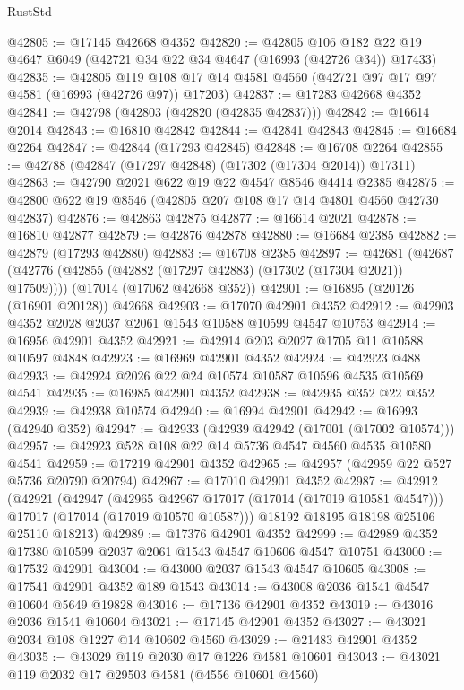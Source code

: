 \begin{lexlean}{RustStd}
\begin{coremodule}
@42805 := @17145 @42668 @4352
@42820 := @42805
    @106
    @182
    @22
    @19
    @4647
    @6049
    (@42721 @34 @22 @34 @4647 (@16993 (@42726 @34)) @17433)
@42835 := @42805
    @119
    @108
    @17
    @14
    @4581
    @4560
    (@42721 @97 @17 @97 @4581 (@16993 (@42726 @97)) @17203)
@42837 := @17283 @42668 @4352
@42841 := @42798 (@42803 (@42820 (@42835 @42837)))
@42842 := @16614 @2014
@42843 := @16810 @42842
@42844 := @42841 @42843
@42845 := @16684 @2264
@42847 := @42844 (@17293 @42845)
@42848 := @16708 @2264
@42855 := @42788 (@42847 (@17297 @42848) (@17302 (@17304 @2014)) @17311)
@42863 := @42790 @2021 @622 @19 @22 @4547 @8546 @4414 @2385
@42875 := @42800 @622 @19 @8546 (@42805 @207 @108 @17 @14 @4801 @4560 @42730 @42837)
@42876 := @42863 @42875
@42877 := @16614 @2021
@42878 := @16810 @42877
@42879 := @42876 @42878
@42880 := @16684 @2385
@42882 := @42879 (@17293 @42880)
@42883 := @16708 @2385
@42897 := @42681
    (@42687 (@42776 (@42855 (@42882 (@17297 @42883) (@17302 (@17304 @2021)) @17509))))
    (@17014 (@17062 @42668 @352))
@42901 := @16895 (@20126 (@16901 @20128)) @42668
@42903 := @17070 @42901 @4352
@42912 := @42903 @4352 @2028 @2037 @2061 @1543 @10588 @10599 @4547 @10753
@42914 := @16956 @42901 @4352
@42921 := @42914 @203 @2027 @1705 @11 @10588 @10597 @4848
@42923 := @16969 @42901 @4352
@42924 := @42923 @488
@42933 := @42924 @2026 @22 @24 @10574 @10587 @10596 @4535 @10569 @4541
@42935 := @16985 @42901 @4352
@42938 := @42935 @352 @22 @352
@42939 := @42938 @10574
@42940 := @16994 @42901
@42942 := @16993 (@42940 @352)
@42947 := @42933 (@42939 @42942 (@17001 (@17002 @10574)))
@42957 := @42923 @528 @108 @22 @14 @5736 @4547 @4560 @4535 @10580 @4541
@42959 := @17219 @42901 @4352
@42965 := @42957 (@42959 @22 @527 @5736 @20790 @20794)
@42967 := @17010 @42901 @4352
@42987 := @42912
    (@42921
      (@42947
        (@42965 @42967 @17017 (@17014 (@17019 @10581 @4547)))
        @17017
        (@17014 (@17019 @10570 @10587)))
      @18192
      @18195
      @18198
      @25106
      @25110
      @18213)
@42989 := @17376 @42901 @4352
@42999 := @42989 @4352 @17380 @10599 @2037 @2061 @1543 @4547 @10606 @4547 @10751
@43000 := @17532 @42901
@43004 := @43000 @2037 @1543 @4547 @10605
@43008 := @17541 @42901 @4352 @189 @1543
@43014 := @43008 @2036 @1541 @4547 @10604 @5649 @19828
@43016 := @17136 @42901 @4352
@43019 := @43016 @2036 @1541 @10604
@43021 := @17145 @42901 @4352
@43027 := @43021 @2034 @108 @1227 @14 @10602 @4560
@43029 := @21483 @42901 @4352
@43035 := @43029 @119 @2030 @17 @1226 @4581 @10601
@43043 := @43021 @119 @2032 @17 @29503 @4581 (@4556 @10601 @4560)

\end{coremodule}
\end{lexlean}
